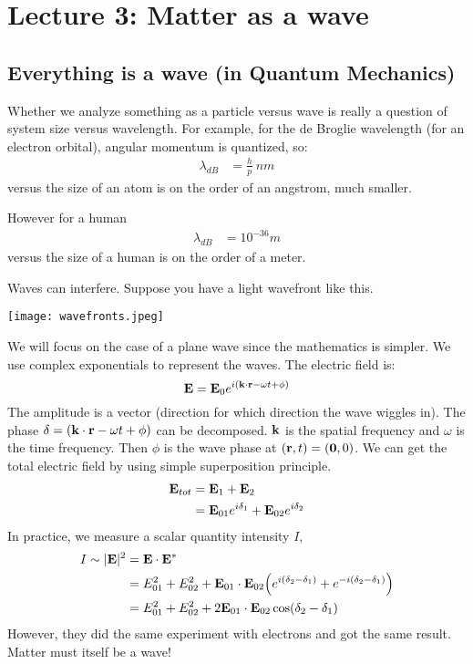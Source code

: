 \section{Lecture 3: Matter as a wave}

\subsection{Everything is a wave (in Quantum Mechanics)}

Whether we analyze something as a particle versus wave is really a question of system size versus wavelength.
For example, for the de Broglie wavelength (for an electron orbital), angular momentum is quantized, so:
\begin{align*}
    \lambda_{dB} &= \frac{h}{p} ~ nm
\end{align*}
versus the size of an atom is on the order of an angstrom, much smaller.

However for a human
\begin{align*}
    \lambda_{dB} &= 10^{-36} m
\end{align*}
versus the size of a human is on the order of a meter.

Waves can interfere. Suppose you have a light wavefront like this.

\texttt{[image: wavefronts.jpeg]}

We will focus on the case of a plane wave since the mathematics is simpler. We use complex exponentials to represent the waves. The electric field is:
\[ \mathbf{E} = \mathbf{E}_0  e^{i(\mathbf{k} \cdot \mathbf{r} - \omega t + \phi)} \]
The amplitude is a vector (direction for which direction the wave wiggles in). The phase $\delta = (\mathbf{k} \cdot \mathbf{r} - \omega t + \phi)$ can be decomposed.
$\mathbf{k}$ is the spatial frequency and $\omega$ is the time frequency. Then $\phi$ is the wave phase at $(\mathbf{r}, t) = (\mathbf{0}, 0)$.
We can get the total electric field by using simple superposition principle.
\begin{align*}
    \mathbf{E}_{tot} &= \mathbf{E}_1 + \mathbf{E}_2 \\
    &= \mathbf{E}_{01} e^{i \delta_1} + \mathbf{E}_{02} e^{i \delta_2}
\end{align*}
In practice, we measure a scalar quantity intensity $I$,
\begin{align*}
    I \sim |\mathbf{E}|^2 &= \mathbf{E} \cdot \mathbf{E}^* \\
    &= E_{01}^2 + E_{02}^2 + \mathbf{E}_{01} \cdot \mathbf{E}_{02} \qty(e^{i (\delta_2 - \delta_1)} + e^{-i(\delta_2 - \delta_1)}) \\
    &= E_{01}^2 + E_{02}^2 + 2 \mathbf{E}_{01} \cdot \mathbf{E}_{02} \cos(\delta_2 - \delta_1)
\end{align*}
However, they did the same experiment with electrons and got the same result. Matter must itself be a wave!


